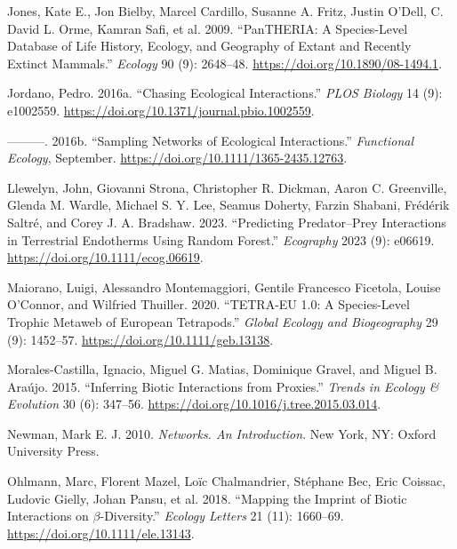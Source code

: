 \documentclass[
  letterpaper,
  DIV=11,
  numbers=noendperiod]{scrartcl}
\newlength{\cslhangindent}
\newenvironment{CSLReferences}[2] %
 {\begin{list}{}{%
  \setlength{\itemindent}{0pt}
  \setlength{\leftmargin}{0pt}
  \setlength{\parsep}{0pt}
  \ifodd #1
   \setlength{\leftmargin}{\cslhangindent}
   \setlength{\itemindent}{-1\cslhangindent}
  \fi
  \setlength{\itemsep}{#2\baselineskip}}}
 {\end{list}}
\begin{document}
\begin{CSLReferences}{1}{0}
Jones, Kate E., Jon Bielby, Marcel Cardillo, Susanne A. Fritz, Justin
O'Dell, C. David L. Orme, Kamran Safi, et al. 2009. {``{PanTHERIA}: A
Species-Level Database of Life History, Ecology, and Geography of Extant
and Recently Extinct Mammals.''} \emph{Ecology} 90 (9): 2648--48.
\url{https://doi.org/10.1890/08-1494.1}.

Jordano, Pedro. 2016a. {``Chasing {Ecological Interactions}.''}
\emph{PLOS Biology} 14 (9): e1002559.
\url{https://doi.org/10.1371/journal.pbio.1002559}.

---------. 2016b. {``Sampling Networks of Ecological Interactions.''}
\emph{Functional Ecology}, September.
\url{https://doi.org/10.1111/1365-2435.12763}.

Llewelyn, John, Giovanni Strona, Christopher R. Dickman, Aaron C.
Greenville, Glenda M. Wardle, Michael S. Y. Lee, Seamus Doherty, Farzin
Shabani, Frédérik Saltré, and Corey J. A. Bradshaw. 2023. {``Predicting
Predator--Prey Interactions in Terrestrial Endotherms Using Random
Forest.''} \emph{Ecography} 2023 (9): e06619.
\url{https://doi.org/10.1111/ecog.06619}.

Maiorano, Luigi, Alessandro Montemaggiori, Gentile Francesco Ficetola,
Louise O'Connor, and Wilfried Thuiller. 2020. {``{TETRA-EU} 1.0: {A}
Species-Level Trophic Metaweb of {European} Tetrapods.''} \emph{Global
Ecology and Biogeography} 29 (9): 1452--57.
\url{https://doi.org/10.1111/geb.13138}.

Morales-Castilla, Ignacio, Miguel G. Matias, Dominique Gravel, and
Miguel B. Araújo. 2015. {``Inferring Biotic Interactions from
Proxies.''} \emph{Trends in Ecology \& Evolution} 30 (6): 347--56.
\url{https://doi.org/10.1016/j.tree.2015.03.014}.

Newman, Mark E. J. 2010. \emph{Networks. {An} Introduction}. New York,
NY: Oxford University Press.

Ohlmann, Marc, Florent Mazel, Loïc Chalmandrier, Stéphane Bec, Eric
Coissac, Ludovic Gielly, Johan Pansu, et al. 2018. {``Mapping the
Imprint of Biotic Interactions on {\(\beta\)}-Diversity.''}
\emph{Ecology Letters} 21 (11): 1660--69.
\url{https://doi.org/10.1111/ele.13143}.


\end{CSLReferences}
\end{document}
